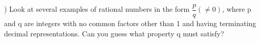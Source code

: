 \documentclass[a4paper,10pt]{article}
\begin{document}
) Look at several examples of rational numbers in the form
$\dfrac{p}{q} (\neq 0)$, where p and q are integers with no common
factors other than 1 and having terminating decimal representations. Can
you guess what property q must satisfy?
\end{document}
